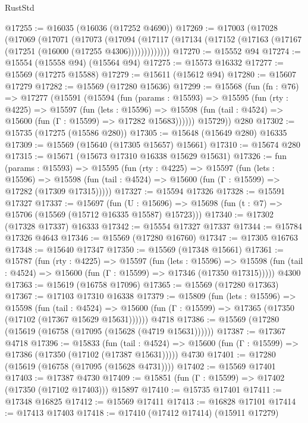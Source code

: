 \begin{lexlean}{RustStd}
\begin{coremodule}
{\begin{coremodule}
{{{{{{{{{{{{{{{{{{{{{{{{{{{{{{{{{{{{{{{{{{{{{{{{{{{{{{{{{{{{@17255 := @16035 (@16036 (@17252 @4690))
@17269 := @17003
    (@17028
      (@17069
        (@17071
          (@17073
            (@17094
              (@17117 (@17134 (@17152 (@17163 (@17167 (@17251 (@16000 (@17255 @4306)))))))))))))
@17270 := @15552 @94
@17274 := @15554 (@15558 @94) (@15564 @94)
@17275 := @15573 @16332
@17277 := @15569 (@17275 @15588)
@17279 := @15611 (@15612 @94)
@17280 := @15607 @17279
@17282 := @15569 (@17280 @15636)
@17299 := @15568
    (fun (fn : @76) =>
    @17277
      (@15591
        (@15594
          (fun (params : @15593) =>
          @15595
            (fun (rty : @4225) =>
            @15597
              (fun (lets : @15596) =>
              @15598 (fun (tail : @4524) => @15600 (fun (Γ : @15599) => @17282 @15683))))))
        @15729))
    @280
@17302 := @15735 (@17275 (@15586 @280))
@17305 := @15648 (@15649 @280) @16335
@17309 := @15569 (@15640 (@17305 @15657) @15661)
@17310 := @15674 @280
@17315 := @15671 (@15673 @17310 @16338 @15629 @15631)
@17326 := fun (params : @15593) =>
  @15595
    (fun (rty : @4225) =>
    @15597
      (fun (lets : @15596) =>
      @15598 (fun (tail : @4524) => @15600 (fun (Γ : @15599) => @17282 (@17309 @17315)))))
@17327 := @15594 @17326
@17328 := @15591 @17327
@17337 := @15697
    (fun (U : @15696) => @15698 (fun (t : @7) => @15706 (@15569 (@15712 @16335 @15587) @15723)))
@17340 := @17302 (@17328 @17337) @16333
@17342 := @15554 @17327 @17337
@17344 := @15784 @17326 @4643
@17346 := @15569 (@17280 @16760)
@17347 := @17305 @16763
@17348 := @15640 @17347
@17350 := @15569 (@17348 @15661)
@17361 := @15787
    (fun (rty : @4225) =>
    @15597
      (fun (lets : @15596) =>
      @15598 (fun (tail : @4524) => @15600 (fun (Γ : @15599) => @17346 (@17350 @17315)))))
    @4300
@17363 := @15619 (@16758 @17096)
@17365 := @15569 (@17280 @17363)
@17367 := @17103 @17310 @16338
@17379 := @15809
    (fun (lets : @15596) =>
    @15598
      (fun (tail : @4524) =>
      @15600 (fun (Γ : @15599) => @17365 (@17350 (@17102 (@17367 @15629 @15631))))))
    @4718
@17386 := @15569 (@17280 (@15619 (@16758 (@17095 (@15628 (@4719 @15631))))))
@17387 := @17367 @4718
@17396 := @15833
    (fun (tail : @4524) => @15600 (fun (Γ : @15599) => @17386 (@17350 (@17102 (@17387 @15631)))))
    @4730
@17401 := @17280 (@15619 (@16758 (@17095 (@15628 @4731))))
@17402 := @15569 @17401
@17403 := @17387 @4730
@17409 := @15851 (fun (Γ : @15599) => @17402 (@17350 (@17102 @17403))) @15897
@17410 := @15735 @17401
@17411 := @17348 @16825
@17412 := @15569 @17411
@17413 := @16828 @17101
@17414 := @17413 @17403
@17418 := @17410 (@17412 @17414) (@15911 @17279)
}}}}}}}}}}}}}}}}}}}}}}}}}}}}}}}}}}}}}}}}}}}}}}}}}}}}}}}}}}}}
\end{coremodule}}
\end{coremodule}
\end{lexlean}
